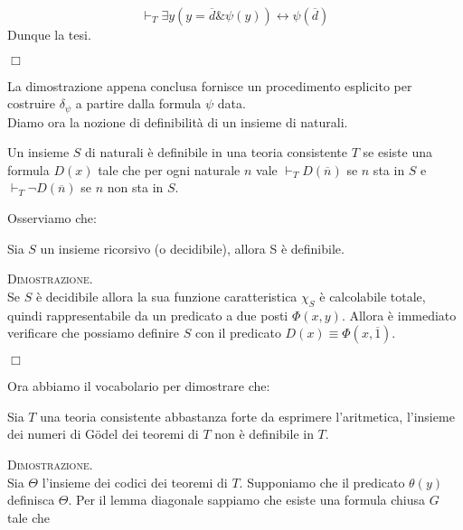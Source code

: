 	$$
	\vdash_{T} \exists y(y=\overline{d}\&\psi(y)) \leftrightarrow \psi(\overline{d})
	$$
	Dunque la tesi.
	\begin{flushright}$\Box$\end{flushright}

	La dimostrazione appena conclusa fornisce un procedimento esplicito
	per costruire $\delta_{\psi}$ a partire dalla formula $\psi$ data.\\  
	Diamo ora la nozione di definibilit\`a di un insieme di naturali.
	
	\begin{defi} Un insieme $S$ di naturali \`e definibile in una
	teoria consistente $T$ se esiste una formula $D(x)$ tale che
	per ogni naturale $n$ vale $\vdash_{T}D(\overline{n})$ se $n$
	sta in $S$ e $\vdash_{T}\neg D(\overline{n})$ se $n$ non sta in $S$.
	\end{defi}
	
	Osserviamo che:
	
	\begin{prop}
	Sia $S$ un insieme ricorsivo (o decidibile), allora S \`e
	definibile.
	\end{prop}
	
	\textsc{Dimostrazione.}\\
	Se $S$ \`e decidibile allora la sua funzione caratteristica $\chi_S$ \`e
	calcolabile totale, quindi rappresentabile da un predicato a due posti
	$\varPhi(x,y)$. Allora \`e immediato verificare che possiamo definire $S$
	con il predicato $D(x)\equiv \varPhi(x, \overline{1}) $.
	\begin{flushright}$\Box$\end{flushright}
	
	Ora abbiamo il vocabolario per dimostrare che:
	
	\begin{prop}
	Sia $T$ una teoria consistente abbastanza forte da esprimere l'aritmetica,
	l'insieme dei numeri di G\"odel dei teoremi di $T$ non \`e definibile in $T$.
	\end{prop}
	
	\textsc{Dimostrazione.}\\
	Sia $\Theta$ l'insieme dei codici dei teoremi di $T$. Supponiamo che il predicato
	$\theta(y)$ definisca $\Theta$. Per il lemma diagonale sappiamo che esiste una
	formula chiusa $G$ tale che
	
